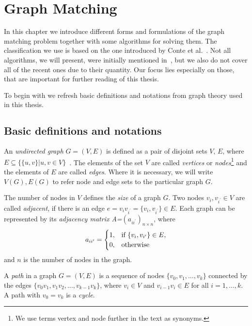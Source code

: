 
\chapter{Graph Matching} \label{chapter:GM}
In this chapter we introduce different forms and formulations of the graph matching problem together with some algorithms for solving them.
The classification we use is based on the one introduced by Conte et al.~\cite{Conte2004}. Not all algorithms, we will present, were initially mentioned in~\cite{Conte2004}, but we also do not cover all of the recent ones due to their quantity. Our focus lies especially on those, that are important for further reading of this thesis.

To begin with we refresh basic definitions and notations from graph theory used in this thesis.
\section{Basic definitions and notations}
An \emph{undirected graph} $G=(V,E)$ is defined as a pair of disjoint sets $V$, $E$, where $E\subseteq\{\{u,v\}| u, v\in V\}$~\cite{Diestel2000}. The elements of the set $V$ are called \emph{vertices} or \emph{nodes}\footnote{We use terms vertex and node further in the text as synonyms.} and the elements of $E$ are called \emph{edges}. Where it is necessary, we will write $V(G), E(G)$ to refer node and edge sets to the particular graph $G$.

The number of nodes in $V$ defines the \emph{size} of a graph $G$.
Two nodes $v_{i},v_{i^\prime}\in V$ are called \emph{adjacent}, if there is an edge $e=v_{i}v_{i^\prime}=\{v_{i},v_{i^\prime}\}\in E$. Each graph can be represented by its \emph{adjacency matrix A=$(a_{ii^\prime})_{n\times n}$}, where 
\begin{equation*}\centering
a_{ii^\prime}=\begin{cases}
 1, & \text{if } \{v_{i},v_{i^\prime}\}\in E, \\
 0, & \text{otherwise} \\
\end{cases}
\end{equation*}
and $n$ is the number of nodes in the graph.

A \emph{path} in a graph $G=(V,E)$ is a sequence of nodes $\{v_0,v_1,\dots,v_k\}$ connected by the edges $\{v_0v_1,v_1v_2,\dots,v_{k-1}v_k\}$, where $v_i\in V$ and $v_{i-1}v_i\in E$ for all $i=1,\dots,k$. A path with $v_0=v_k$ is a \emph{cycle}.

